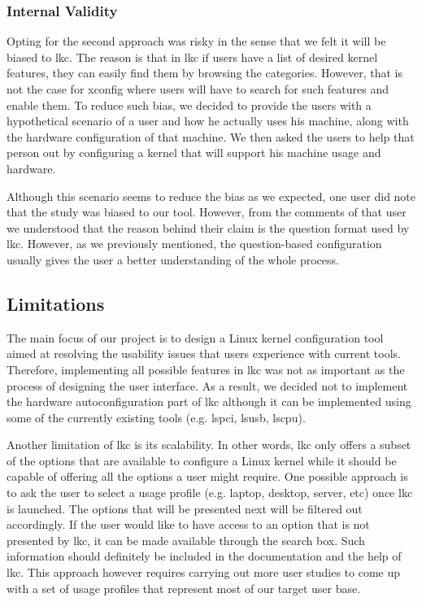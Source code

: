 \documentclass{chi2009}
\begin{document}
\subsubsection{Internal Validity}
Opting for the second approach was risky in the sense that we felt it will be biased to \textsf{lkc}. The reason is that in \textsf{lkc} if users have a
list of desired kernel features, they can easily find them by browsing the categories. However, that is not the case for \textsf{xconfig} where users will
have to search for such features and enable them. To reduce such bias, we decided to provide the users with a hypothetical scenario of a user and how he
actually uses his machine, along with the hardware configuration of that machine. We then asked the users to help that person out by configuring a kernel that
will support his machine usage and hardware.

Although this scenario seems to reduce the bias as we expected, one user did note that the study was biased to our tool. However, from the comments of that
user we understood that the reason behind their claim is the question format used by \textsf{lkc}. However, as we previously mentioned, the question-based
configuration usually gives the user a better understanding of the whole process.

\subsection{Limitations}
The main focus of our project is to design a Linux kernel configuration tool aimed at resolving the usability issues that users experience with current tools.
Therefore, implementing all possible features in \textsf{lkc} was not as important as the process of designing the user interface. As a result, we decided not
to implement the hardware autoconfiguration part of \textsf{lkc} although it can be implemented using some of the currently existing tools (e.g. \textsf{lspci},
\textsf{lsusb}, \textsf{lscpu}).

Another limitation of \textsf{lkc} is its scalability. In other words, \textsf{lkc} only offers a subset of the options that are available to configure a Linux
kernel while it should be capable of offering all the options a user might require. One possible approach is to ask the user to select a usage profile (e.g.
laptop, desktop, server, etc) once \textsf{lkc} is launched. The options that will be presented next will be filtered out accordingly. If the user would like to
have access to an option that is not presented by \textsf{lkc}, it can be made available through the search box. Such information should definitely be included
in the documentation and the help of \textsf{lkc}. This approach however requires carrying out more user studies to come up with a set of usage profiles that
represent most of our target user base.
\end{document}
